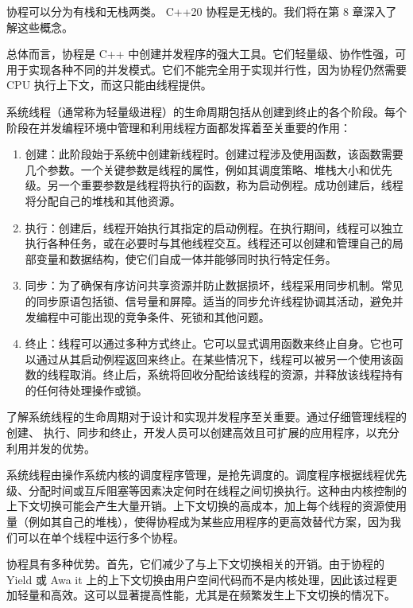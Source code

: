 协程可以分为有栈和无栈两类。 C++20 协程是无栈的。我们将在第 8 章深入了解这些概念。

总体而言，协程是 C++ 中创建并发程序的强大工具。它们轻量级、协作性强，可用于实现各种不同的并发模式。它们不能完全用于实现并行性，因为协程仍然需要 CPU 执行上下文，而这只能由线程提供。


系统线程（通常称为轻量级进程）的生命周期包括从创建到终止的各个阶段。每个阶段在并发编程环境中管理和利用线程方面都发挥着至关重要的作用：

\begin{enumerate}
\item
创建：此阶段始于系统中创建新线程时。创建过程涉及使用函数，该函数需要几个参数。一个关键参数是线程的属性，例如其调度策略、堆栈大小和优先级。另一个重要参数是线程将执行的函数，称为启动例程。成功创建后，线程将分配自己的堆栈和其他资源。

\item
执行：创建后，线程开始执行其指定的启动例程。在执行期间，线程可以独立执行各种任务，或在必要时与其他线程交互。线程还可以创建和管理自己的局部变量和数据结构，使它们自成一体并能够同时执行特定任务。

\item
同步：为了确保有序访问共享资源并防止数据损坏，线程采用同步机制。常见的同步原语包括锁、信号量和屏障。适当的同步允许线程协调其活动，避免并发编程中可能出现的竞争条件、死锁和其他问题。

\item
终止：线程可以通过多种方式终止。它可以显式调用函数来终止自身。它也可以通过从其启动例程返回来终止。在某些情况下，线程可以被另一个使用该函数的线程取消。终止后，系统将回收分配给该线程的资源，并释放该线程持有的任何待处理操作或锁。
\end{enumerate}

了解系统线程的生命周期对于设计和实现并发程序至关重要。通过仔细管理线程的创建、 执行、同步和终止，开发人员可以创建高效且可扩展的应用程序，以充分利用并发的优势。


系统线程由操作系统内核的调度程序管理，是抢先调度的。调度程序根据线程优先级、分配时间或互斥阻塞等因素决定何时在线程之间切换执行。这种由内核控制的上下文切换可能会产生大量开销。上下文切换的高成本，加上每个线程的资源使用量（例如其自己的堆栈），使得协程成为某些应用程序的更高效替代方案，因为我们可以在单个线程中运行多个协程。

协程具有多种优势。首先，它们减少了与上下文切换相关的开销。由于协程的 Yield 或 Awa it 上的上下文切换由用户空间代码而不是内核处理，因此该过程更加轻量和高效。这可以显著提高性能，尤其是在频繁发生上下文切换的情况下。

